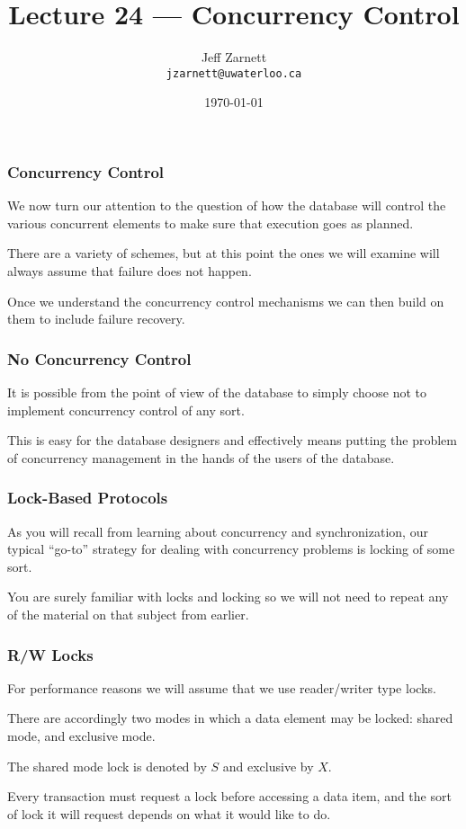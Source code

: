

\title{Lecture 24 --- Concurrency Control }

\author{Jeff Zarnett \\ \small \texttt{jzarnett@uwaterloo.ca}}
\date{\today}




\begin{frame}
  \titlepage

 \end{frame}


\begin{frame}
\frametitle{Concurrency Control}

We now turn our attention to the question of how the database will control the various concurrent elements to make sure that execution goes as planned. 

There are a variety of schemes, but at this point the ones we will examine will always assume that failure does not happen. 

Once we understand the concurrency control mechanisms we can then build on them to include failure recovery.


\end{frame}

\begin{frame}
\frametitle{No Concurrency Control}

It is possible from the point of view of the database to simply choose not to implement concurrency control of any sort. 

This is easy for the database designers and effectively means putting the problem of concurrency management in the hands of the users of the database.

\end{frame}

\begin{frame}
\frametitle{Lock-Based Protocols}

As you will recall from learning about concurrency and synchronization, our typical ``go-to'' strategy for dealing with concurrency problems is locking of some sort. 

You are surely familiar with locks and locking so we will not need to repeat any of the material on that subject from earlier. 

\end{frame}

\begin{frame}
\frametitle{R/W Locks}

For performance reasons we will assume that we use reader/writer type locks. 

There are accordingly two modes in which a data element may be locked: shared mode, and exclusive mode. 

The shared mode lock is denoted by $S$ and exclusive by $X$. 


Every transaction must request a lock before accessing a data item, and the sort of lock it will request depends on what it would like to do.


\end{frame}

